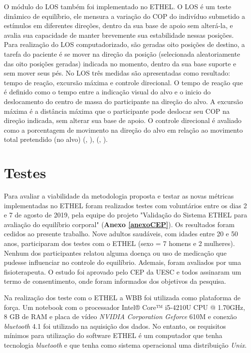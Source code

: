 O módulo do LOS também foi implementado no ETHEL. O LOS é um teste dinâmico de equilíbrio, ele mensura a variação do COP do indivíduo submetido a estímulos em diferentes direções, dentro da sua base de apoio sem alterá-la, e avalia sua capacidade de manter brevemente sua estabilidade nessas posições. Para realização do LOS computadorizado, são geradas oito posições de destino, a tarefa do paciente é se mover na direção da posição (selecionada aleatoriamente das oito posições geradas) indicada no momento, dentro da sua base suporte e sem mover seus pés. No LOS três medidas são apresentadas como resultado: tempo de reação, excursão máxima e controle direcional. O tempo de reação que é definido como o tempo entre a indicação visual do alvo e o inicio do deslocamento do centro de massa do participante na direção do alvo. A excursão máxima é a distância máxima que o participante pode deslocar seu COP na direção indicada, sem alterar sua base de apoio. O controle direcional é avaliado como a porcentagem de movimento na direção do alvo em relação ao movimento total pretendido (no alvo) (\citeauthor{tsang2003effects}, \citeyear{tsang2003effects}), (\citeauthor{llorens2015low}, \citeyear{llorens2015low}).

\section{Testes}
Para avaliar a viabilidade da metodologia proposta e testar as novas métricas implementadas no ETHEL foram realizados testes com voluntários entre os dias 2 e 7 de agosto de 2019, pela equipe do projeto "Validação do Sistema ETHEL para avaliação do equilíbrio corporal" (\textbf{Anexo \ref{anexoCEP}}). Os resultados foram cedidos ao presente trabalho. Nove adultos saudáveis, com idades entre 20 e 50 anos, participaram dos testes com o ETHEL (sexo = 7 homens e 2 mulheres). Nenhum dos participantes relatou alguma doença ou uso de medicação que pudesse influenciar no controle do equilíbrio. Ademais, foram avaliados por uma fisioterapeuta. O estudo foi aprovado pelo CEP da UESC e todos assinaram um termo de consentimento, onde foram informados dos objetivos da pesquisa. 

Na realização dos teste com o ETHEL a WBB foi utilizada como plataforma de força. Um notebook
com o processador Intel® Core™ i5-4210U CPU @ 1.70GHz, 8 GB de RAM e placa de vídeo \textit{NVIDIA Corporation Geforce} 610M e conexão \textit{bluetooth} 4.1 foi utilizado na aquisição dos dados. No entanto, os requisitos mínimos para utilização do software ETHEL é um computador que tenha tecnologia \textit{bluetooth} e que tenha como sistema operacional uma distribuição \textit{Unix}.

